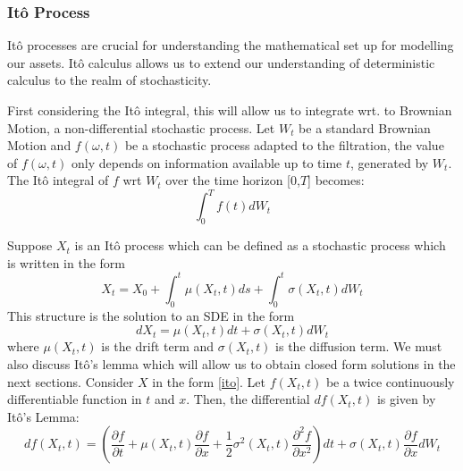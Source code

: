\documentclass[12pt]{article}
\newcommand{\newp}
    {
    \vskip 0.5cm 
  }
\numberwithin{equation}{section}
\begin{document}
\subsubsection{It\^{o} Process}
It\^{o} processes are crucial for understanding the mathematical set up for 
modelling our assets. It\^{o} calculus allows us to extend our understanding of 
deterministic calculus to the realm of stochasticity\autocite{benchugg}.
\newp 
First considering the It\^{o} integral, this will allow us to integrate wrt. 
to Brownian Motion, a non-differential stochastic process. Let $W_t$ be a 
standard Brownian Motion and $f(\omega,t)$ be a stochastic process adapted to the 
filtration, the value of $f(\omega,t)$ only depends on information available 
up to time $t$, generated by $W_t$. The It\^{o} integral of $f$ wrt $W_t$ over 
the time horizon [0,$T$] becomes: 
\begin{equation}
\int_0^T f(t) dW_t
\end{equation}

Suppose $X_t$ is an It\^{o} process which can be 
defined as a stochastic process which is written in the form 
\begin{equation}
  X_t = X_0 + \int^t_0 \mu(X_t,t) ds + \int^t_0 \sigma(X_t,t) dW_t
\end{equation}
This structure is the solution to an SDE in the form 
\begin{equation}\label{ito}
  dX_t = \mu(X_t,t)dt + \sigma(X_t,t)dW_t
\end{equation}
where $\mu(X_t,t)$ is the drift term and $\sigma(X_t,t)$ is the diffusion term.
We must also discuss It\^{o}'s lemma which will allow us to obtain closed 
form solutions in the next sections. Consider $X$ in the form \ref{ito}. 
Let $f(X_t,t)$ be a twice continuously differentiable function in $t$ and $x$. 
Then, the differential $df(X_t,t)$ is given by It\^{o}'s Lemma:
\begin{equation}
  df(X_t,t) = \left( \frac{\partial f}{\partial t} + \mu(X_t,t) \frac{\partial f}
  {\partial x} + \frac{1}{2} \sigma^2(X_t,t) \frac{\partial^2 f}{\partial x^2} \right) 
  dt + \sigma(X_t,t) \frac{\partial f}{\partial x}dW_t

\end{equation}
\end{document}
